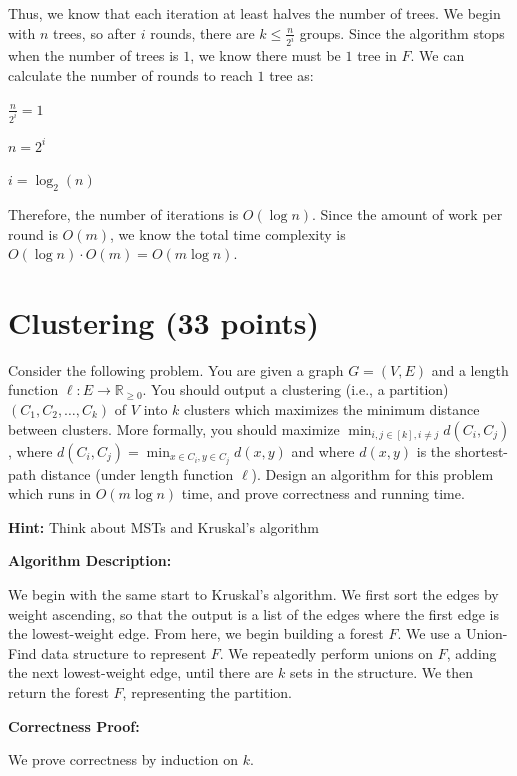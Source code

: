 \documentclass[11pt]{article}
\begin{document}
\begin{enumerate}[resume]
Thus, we know that each iteration at least halves the number of trees. We begin with $n$ trees, so after $i$ rounds, there are $k \leq \frac{n}{2^{i}}$ 
groups. Since the algorithm stops when the number of trees is $1$, we know there must be $1$ tree in $F$. 
We can calculate the number of rounds to reach $1$ tree as: 

$\frac{n}{2^{i}} = 1$

$n = 2^{i}$

$i = \log_2 (n)$

Therefore, the number of iterations is $O(\log n)$. 
Since the amount of work per round is $O(m)$, we know the total time complexity is $O(\log n) \cdot O(m) = O(m \log n)$.


\end{enumerate}


\section{Clustering (33 points)}
Consider the following problem. You are given a graph $G = (V, E)$ and a length function $\ell : E \rightarrow \mathbb{R}_{\geq 0}$. 
You should output a clustering (i.e., a partition) $(C_1, C_2, \dots, C_k)$ of $V$ into $k$ clusters which maximizes the minimum distance between clusters. 
More formally, you should maximize $\min_{i,j \in [k], i \neq j} d(C_i, C_j)$, where $d(C_i, C_j) = \min_{x \in C_i, y \in C_j} d(x,y)$ 
and where $d(x,y)$ is the shortest-path distance (under length function $\ell$).  Design an algorithm for this problem which runs in $O(m \log n)$ time, 
and prove correctness and running time.  

\textbf{Hint:} Think about MSTs and Kruskal's algorithm

\bigbreak

\textbf{Algorithm Description:}

We begin with the same start to Kruskal's algorithm. We first sort the edges by weight ascending, 
so that the output is a list of the edges where the first edge is the lowest-weight edge. From here, we begin building a forest $F$. 
We use a Union-Find data structure to represent $F$. We repeatedly perform unions on $F$, adding the next lowest-weight edge, 
until there are $k$ sets in the structure. We then return the forest $F$, representing the partition.

\bigbreak

\textbf{Correctness Proof:}

We prove correctness by induction on $k$. 
\end{document}
